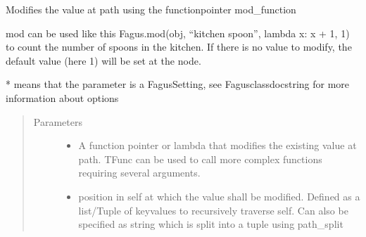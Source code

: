 \documentclass[a4paper,10pt,english]{sphinxmanual}
\begin{document}
\begin{fulllineitems}
\begin{fulllineitems}
\label{\detokenize{fagus.fagus:fagus.fagus.Fagus.mod}}
\pysigstartsignatures
{}
\pysigstopsignatures
\sphinxAtStartPar
Modifies the value at path using the function\sphinxhyphen{}pointer mod\_function

\sphinxAtStartPar
mod can be used like this Fagus.mod(obj, “kitchen spoon”, lambda x: x + 1, 1) to count the number of spoons in
the kitchen. If there is no value to modify, the default value (here 1) will be set at the node.

\sphinxAtStartPar
* means that the parameter is a Fagus\sphinxhyphen{}Setting, see Fagus\sphinxhyphen{}class\sphinxhyphen{}docstring for more information about options
\begin{quote}\begin{description}
\item[{Parameters}] \leavevmode\begin{itemize}
\item {}
\sphinxAtStartPar
{} \textendash{} A function pointer or lambda that modifies the existing value at path. TFunc can be used to
call more complex functions requiring several arguments.

\item {}
\sphinxAtStartPar
{} \textendash{} position in self at which the value shall be modified. Defined as a list/Tuple of key\sphinxhyphen{}values to
recursively traverse self. Can also be specified as string which is split into a tuple using path\_split


\end{itemize}
\end{description}
\end{quote}
\end{fulllineitems}
\end{fulllineitems}
\end{document}
